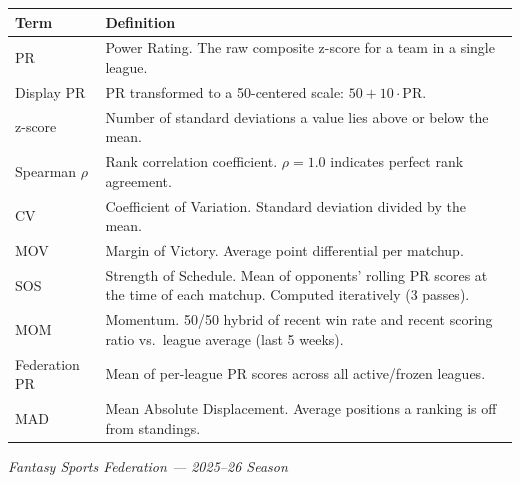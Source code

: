 \documentclass[11pt,a4paper]{article}
\begin{document}
\begin{table}[H]
\centering
\begin{tabular}{@{}lp{10cm}@{}}
\toprule
\textbf{Term} & \textbf{Definition}\\
\midrule
PR & Power Rating. The raw composite z-score for a team in a single league.\\
Display PR & PR transformed to a 50-centered scale: $50 + 10 \cdot \text{PR}$.\\
z-score & Number of standard deviations a value lies above or below the mean.\\
Spearman $\rho$ & Rank correlation coefficient. $\rho = 1.0$ indicates perfect rank agreement.\\
CV & Coefficient of Variation. Standard deviation divided by the mean.\\
MOV & Margin of Victory. Average point differential per matchup.\\
SOS & Strength of Schedule. Mean of opponents' rolling PR scores at the time of each matchup. Computed iteratively (3 passes).\\
MOM & Momentum. 50/50 hybrid of recent win rate and recent scoring ratio vs.\ league average (last 5 weeks).\\
Federation PR & Mean of per-league PR scores across all active/frozen leagues.\\
MAD & Mean Absolute Displacement. Average positions a ranking is off from standings.\\
\bottomrule
\end{tabular}
\end{table}

\vfill
\begin{center}
\textit{Fantasy Sports Federation --- 2025--26 Season}
\end{center}
\end{document}
